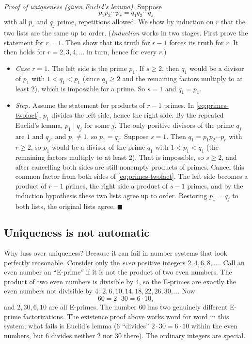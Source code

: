 \emph{Proof of uniqueness (given Euclid's lemma).} Suppose
\begin{equation}
p_1p_2\cdots p_r = q_1q_2\cdots q_s
\label{eq:primes-twofact}
\end{equation}
with all $p_i$ and $q_j$ prime, repetitions allowed. We show by induction on $r$ that the two lists are the same up to order. (\emph{Induction} works in two stages. First prove the statement for $r=1$. Then show that its truth for $r-1$ forces its truth for $r$. It then holds for $r=2,3,4,\dots$ in turn, hence for every $r$.)
\begin{itemize}
\item \emph{Case $r=1$.} The left side is the prime $p_1$. If $s\ge2$, then $q_1$ would be a divisor of $p_1$ with $1<q_1<p_1$ (since $q_1\ge2$ and the remaining factors multiply to at least 2), which is impossible for a prime. So $s=1$ and $q_1=p_1$.
\item \emph{Step.} Assume the statement for products of $r-1$ primes. In \cref{eq:primes-twofact}, $p_1$ divides the left side, hence the right side. By the repeated Euclid's lemma, $p_1\mid q_j$ for some $j$. The only positive divisors of the prime $q_j$ are $1$ and $q_j$, and $p_1\neq1$, so $p_1=q_j$. Suppose $s=1$. Then $q_1=p_1p_2\cdots p_r$ with $r\ge2$, so $p_1$ would be a divisor of the prime $q_1$ with $1<p_1<q_1$ (the remaining factors multiply to at least 2). That is impossible, so $s\ge2$, and after cancelling both sides are still nonempty products of primes. Cancel this common factor from both sides of \cref{eq:primes-twofact}. The left side becomes a product of $r-1$ primes, the right side a product of $s-1$ primes, and by the induction hypothesis these two lists agree up to order. Restoring $p_1=q_j$ to both lists, the original lists agree. $\blacksquare$
\end{itemize}

\subsection{Uniqueness is not automatic}

Why fuss over uniqueness? Because it can fail in number systems that look perfectly reasonable. Consider only the \emph{even} positive integers $2,4,6,8,\dots$. Call an even number an ``E-prime'' if it is not the product of two even numbers. The product of two even numbers is divisible by 4, so the E-primes are exactly the even numbers not divisible by 4: $2,6,10,14,18,22,26,30,\dots$ Now
\[
60 = 2\cdot 30 = 6\cdot 10,
\]
and $2,30,6,10$ are all E-primes. The number $60$ has two genuinely different E-prime factorizations. The existence proof above works word for word in this system; what fails is Euclid's lemma ($6$ ``divides'' $2\cdot30=6\cdot10$ within the even numbers, but $6$ divides neither $2$ nor $30$ there). The ordinary integers are special.

